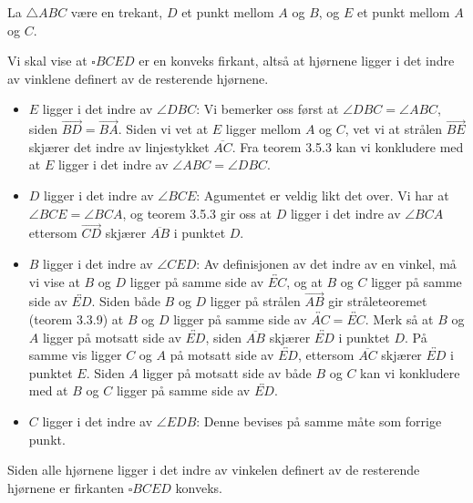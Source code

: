 \begin{oppgave}[4.6.5]
    La $\triangle ABC$ være en trekant, $D$ et punkt mellom $A$ og $B$, og $E$ et punkt mellom $A$ og $C$. 
    
    \begin{figure}[H]
        \centering
        
    \end{figure}

    Vi skal vise at $\square BCED$ er en konveks firkant, altså at hjørnene ligger i det indre av vinklene definert av de resterende hjørnene. 

    \begin{itemize}
        \item $E$ ligger i det indre av $\angle DBC$:
        Vi bemerker oss først at $\angle DBC = \angle ABC$, siden $\overrightarrow{BD} = \overrightarrow{BA}$. 
        Siden vi vet at $E$ ligger mellom $A$ og $C$, vet vi at strålen $\overrightarrow{BE}$ skjærer det indre av linjestykket $\overline{AC}$. 
        Fra teorem 3.5.3 kan vi konkludere med at $E$ ligger i det indre av $\angle ABC = \angle DBC$.  
        \item $D$ ligger i det indre av $\angle BCE$: 
        Agumentet er veldig likt det over. Vi har at $\angle BCE=\angle BCA$, og teorem 3.5.3 gir oss at $D$ ligger i det indre av $\angle BCA$ ettersom $\overrightarrow{CD}$ skjærer $\overline{AB}$ i punktet $D$. 
        \item $B$ ligger i det indre av $\angle CED$: 
        Av definisjonen av det indre av en vinkel, må vi vise at $B$ og $D$ ligger på samme side av $\overleftrightarrow{EC}$, og at $B$ og $C$ ligger på samme side av $\overleftrightarrow{ED}$. 
        Siden både $B$ og $D$ ligger på strålen $\overrightarrow{AB}$ gir stråleteoremet (teorem 3.3.9) at $B$ og $D$ ligger på samme side av $\overleftrightarrow{AC}=\overleftrightarrow{EC}$. 
        Merk så at $B$ og $A$ ligger på motsatt side av $\overleftrightarrow{ED}$, siden $\overline{AB}$ skjærer $\overleftrightarrow{ED}$ i punktet $D$. 
        På samme vis ligger $C$ og $A$ på motsatt side av $\overleftrightarrow{ED}$, ettersom $\overline{AC}$ skjærer $\overleftrightarrow{ED}$ i punktet $E$. 
        Siden $A$ ligger på motsatt side av både $B$ og $C$ kan vi konkludere med at $B$ og $C$ ligger på samme side av $\overleftrightarrow{ED}$. 
        \item $C$ ligger i det indre av $\angle EDB$: Denne bevises på samme måte som forrige punkt. 
    \end{itemize}
    Siden alle hjørnene ligger i det indre av vinkelen definert av de resterende hjørnene er firkanten $\square BCED$ konveks. 
\end{oppgave}

